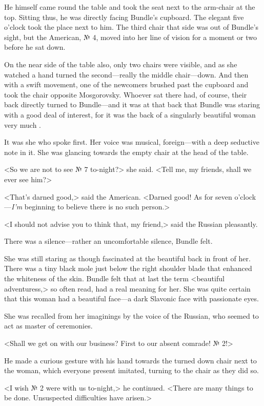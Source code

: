 He himself came round the table and took the seat next to the arm-chair at the top. Sitting thus, he was directly facing Bundle's cupboard. The elegant five o'clock took the place next to him. The third chair that side was out of Bundle's sight, but the American, № 4, moved into her line of vision for a moment or two before he sat down.

On the near side of the table also, only two chairs were visible, and as she watched a hand turned the second—really the middle chair—down. And then with a swift movement, one of the newcomers brushed past the cupboard and took the chair opposite Mosgorovsky. Whoever sat there had, of course, their back directly turned to Bundle—and it was at that back that Bundle was staring with a good deal of interest, for it was the back of a singularly beautiful woman very much .

It was she who spoke first. Her voice was musical, foreign—with a deep seductive note in it. She was glancing towards the empty chair at the head of the table.

<So we are not to see № 7 to-night?> she said. <Tell me, my friends, shall we ever see him?>

<That's darned good,> said the American. <Darned good! As for seven o'clock—\emph{I'm} beginning to believe there is no such person.>

<I should not advise you to think that, my friend,> said the Russian pleasantly.

There was a silence—rather an uncomfortable silence, Bundle felt.

She was still staring as though fascinated at the beautiful back in front of her. There was a tiny black mole just below the right shoulder blade that enhanced the whiteness of the skin. Bundle felt that at last the term <beautiful adventuress,> so often read, had a real meaning for her. She was quite certain that this woman had a beautiful face—a dark Slavonic face with passionate eyes.

She was recalled from her imaginings by the voice of the Russian, who seemed to act as master of ceremonies.

<Shall we get on with our business? First to our absent comrade! № 2!>

He made a curious gesture with his hand towards the turned down chair next to the woman, which everyone present imitated, turning to the chair as they did so.

<I wish № 2 were with us to-night,> he continued. <There are many things to be done. Unsuspected difficulties have arisen.>

